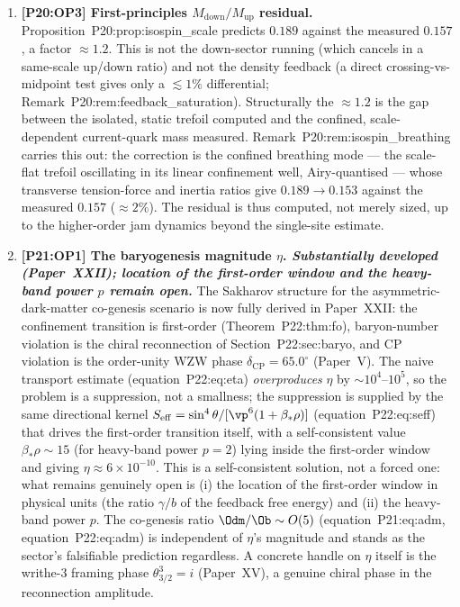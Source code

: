 \begin{enumerate}[label=,leftmargin=*]
\item \textbf{[P20:OP3] First-principles $M_{\mathrm{down}}/M_{\mathrm{up}}$ residual.}
Proposition~P20:prop:isospin\_scale predicts $0.189$ against the measured
$0.157$, a factor $\approx1.2$. This is not the down-sector running (which
cancels in a same-scale up/down ratio) and not the density feedback (a
direct crossing-vs-midpoint test gives only a $\lesssim1\%$ differential;
Remark~P20:rem:feedback\_saturation). Structurally the $\approx1.2$ is the
gap between the isolated, static trefoil computed and the confined,
scale-dependent current-quark mass measured. Remark~P20:rem:isospin\_breathing
carries this out: the correction is the confined breathing mode --- the
scale-flat trefoil oscillating in its linear confinement well,
Airy-quantised --- whose transverse tension-force and inertia ratios give
$0.189\to0.153$ against the measured $0.157$ ($\approx2\%$). The residual
is thus computed, not merely sized, up to the higher-order jam dynamics
beyond the single-site estimate.

\item \textbf{[P21:OP1] The baryogenesis magnitude $\eta$. \emph{Substantially
developed (Paper~XXII); location of the first-order window and the
heavy-band power $p$ remain open.}} The Sakharov structure for the
asymmetric-dark-matter co-genesis scenario is now fully derived in
Paper~XXII: the confinement transition is first-order
(Theorem~P22:thm:fo), baryon-number violation is the chiral reconnection
of Section~P22:sec:baryo, and CP violation is the order-unity WZW phase
$\delta_{\mathrm{CP}}=65.0^\circ$ (Paper~V). The naive transport estimate
(equation~P22:eq:eta) \emph{overproduces} $\eta$ by
$\sim10^4$--$10^5$, so the problem is a suppression, not a smallness; the
suppression is supplied by the same directional kernel
$S_{\mathrm{eff}}=\sin^4\theta/[\vp^6(1+\beta_*\rho)]$
(equation~P22:eq:seff) that drives the first-order transition itself,
with a self-consistent value $\beta_*\rho\sim15$ (for heavy-band power
$p=2$) lying inside the first-order window and giving
$\eta\approx6\times10^{-10}$. This is a self-consistent solution, not a
forced one: what remains genuinely open is (i) the location of the
first-order window in physical units (the ratio $\gamma/b$ of the
feedback free energy) and (ii) the heavy-band power $p$. The co-genesis
ratio $\Odm/\Ob\sim O(5)$ (equation~P21:eq:adm, equation~P22:eq:adm) is
independent of $\eta$'s magnitude and stands as the sector's falsifiable
prediction regardless. A concrete handle on $\eta$ itself is the
writhe-$3$ framing phase $\theta_{3/2}^{3}=i$ (Paper~XV), a genuine
chiral phase in the reconnection amplitude.


\end{enumerate}

